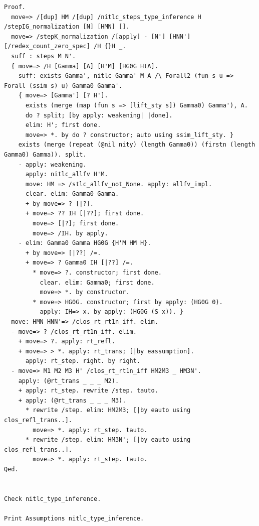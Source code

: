 \documentclass[10pt,a4paper]{article}
\begin{document}
\begin{lstlisting}[style=authorcoq]
Proof.
  move=> /[dup] HM /[dup] /nitlc_steps_type_inference H /stepIG_normalization [N] [HMN] [].
  move=> /stepK_normalization /[apply] - [N'] [HNN'] [/redex_count_zero_spec] /H {}H _.
  suff : steps M N'.
  { move=> /H [Gamma] [A] [H'M] [HG0G HtA].
    suff: exists Gamma', nitlc Gamma' M A /\ Forall2 (fun s u => Forall (ssim s) u) Gamma0 Gamma'.
    { move=> [Gamma'] [? H'].
      exists (merge (map (fun s => [lift_sty s]) Gamma0) Gamma'), A.
      do ? split; [by apply: weakening| |done].
      elim: H'; first done.
      move=> *. by do ? constructor; auto using ssim_lift_sty. }
    exists (merge (repeat (@nil nity) (length Gamma0)) (firstn (length Gamma0) Gamma)). split.
    - apply: weakening.
      apply: nitlc_allfv H'M.
      move: HM => /stlc_allfv_not_None. apply: allfv_impl.
      clear. elim: Gamma0 Gamma.
      + by move=> ? [|?].
      + move=> ?? IH [|??]; first done.
        move=> [|?]; first done.
        move=> /IH. by apply.
    - elim: Gamma0 Gamma HG0G {H'M HM H}.
      + by move=> [|??] /=.
      + move=> ? Gamma0 IH [|??] /=.
        * move=> ?. constructor; first done.
          clear. elim: Gamma0; first done.
          move=> *. by constructor.
        * move=> HG0G. constructor; first by apply: (HG0G 0).
          apply: IH=> x. by apply: (HG0G (S x)). }
  move: HMN HNN'=> /clos_rt_rt1n_iff. elim.
  - move=> ? /clos_rt_rt1n_iff. elim.
    + move=> ?. apply: rt_refl.
    + move=> > *. apply: rt_trans; [|by eassumption].
      apply: rt_step. right. by right.
  - move=> M1 M2 M3 H' /clos_rt_rt1n_iff HM2M3 _ HM3N'.
    apply: (@rt_trans _ _ _ M2).
    + apply: rt_step. rewrite /step. tauto.
    + apply: (@rt_trans _ _ _ M3).
      * rewrite /step. elim: HM2M3; [|by eauto using clos_refl_trans..].
        move=> *. apply: rt_step. tauto.
      * rewrite /step. elim: HM3N'; [|by eauto using clos_refl_trans..].
        move=> *. apply: rt_step. tauto.
Qed.


Check nitlc_type_inference.

Print Assumptions nitlc_type_inference.
\end{lstlisting}
\end{document}
